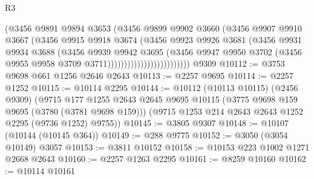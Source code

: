 \begin{lexlean}{R3}
\begin{coremodule}
                                    (@3456
                                      @9891
                                      @9894
                                      @3653
                                      (@3456
                                        @9899
                                        @9902
                                        @3660
                                        (@3456
                                          @9907
                                          @9910
                                          @3667
                                          (@3456
                                            @9915
                                            @9918
                                            @3674
                                            (@3456
                                              @9923
                                              @9926
                                              @3681
                                              (@3456
                                                @9931
                                                @9934
                                                @3688
                                                (@3456
                                                  @9939
                                                  @9942
                                                  @3695
                                                  (@3456
                                                    @9947
                                                    @9950
                                                    @3702
                                                    (@3456
                                                      @9955
                                                      @9958
                                                      @3709
                                                      @3711)))))))))))))))))))))))))
    @9309
@10112 := @3753 @9698 @661 @1256 @2646 @2643
@10113 := @2257 @9695
@10114 := @2257 @1252
@10115 := @10114 @2295
@10144 := @10112
    (@10113 @10115)
    (@2456 @9309)
    (@9715
      @177
      @1255
      @2643
      @2645
      @9695
      @10115
      (@3775 @9698 @159 @9695 (@3780 (@3781 @9698 @159)))
      (@9715 @1253 @214 @2643 @2643 @1252 @2295 (@9736 @1252) @9755))
@10145 := @3805 @9307
@10148 := @10107 (@10144 (@10145 @364))
@10149 := @288 @9775
@10152 := @3050 (@3054 @10149) @3057
@10153 := @3811 @10152
@10158 := @10153 @223 @1002 @1271 @2668 @2643
@10160 := @2257 @1263 @2295
@10161 := @8259 @10160
@10162 := @10114 @10161

\end{coremodule}
\end{lexlean}
